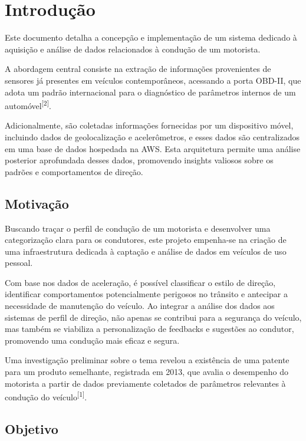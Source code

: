 \chapter{Introdução}\label{CAP:introducao}

Este documento detalha a concepção e implementação de um sistema dedicado à aquisição e análise de dados relacionados à condução de um motorista.

A abordagem central consiste na extração de informações provenientes de sensores já presentes em veículos contemporâneos, acessando a porta OBD-II, que adota um padrão internacional para o diagnóstico de parâmetros internos de um automóvel\textsuperscript{[2]}.

Adicionalmente, são coletadas informações fornecidas por um dispositivo móvel, incluindo dados de geolocalização e acelerômetros, e esses dados são centralizados em uma base de dados hospedada na AWS. Esta arquitetura permite uma análise posterior aprofundada desses dados, promovendo insights valiosos sobre os padrões e comportamentos de direção.

\section{Motivação}

Buscando traçar o perfil de condução de um motorista e desenvolver uma categorização clara para os condutores, este projeto empenha-se na criação de uma infraestrutura dedicada à captação e análise de dados em veículos de uso pessoal.

Com base nos dados de aceleração, é possível classificar o estilo de direção, identificar comportamentos potencialmente perigosos no trânsito e antecipar a necessidade de manutenção do veículo. Ao integrar a análise dos dados aos sistemas de perfil de direção, não apenas se contribui para a segurança do veículo, mas também se viabiliza a personalização de feedbacks e sugestões ao condutor, promovendo uma condução mais eficaz e segura.

Uma investigação preliminar sobre o tema revelou a existência de uma patente para um produto semelhante, registrada em 2013, que avalia o desempenho do motorista a partir de dados previamente coletados de parâmetros relevantes à condução do veículo\textsuperscript{[1]}.


\section{Objetivo}

